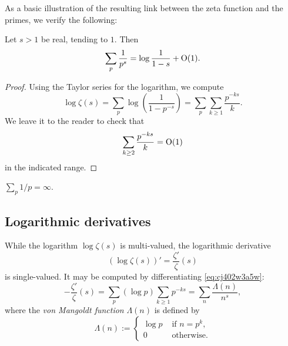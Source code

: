 \documentclass[reqno]{amsart}  \numberwithin{theorem}{section} \numberwithin{equation}{section}
\begin{document}
As a basic illustration of the resulting link between the zeta function and the primes, we verify the following:
\begin{lemma}\label{lemma:cj56e5ihnv}
  Let $s > 1$ be real, tending to $1$.  Then
  \begin{equation*}
    \sum_p \frac{1}{ p^s } = \log \frac{1}{1 - s} + \operatorname{O}(1).
  \end{equation*}
\end{lemma}
\begin{proof}
  Using the Taylor series for the logarithm, we compute
  \begin{equation}\label{eq:cj402w3a5w}
    \log \zeta (s) = \sum_p \log \left( \frac{1}{1 - p^{- s}} \right)
    =
    \sum_p \sum_{k \geq 1} \frac{p^{- k s }}{ k}.
  \end{equation}
  We leave it to the reader to check that
  \begin{equation}
    \sum_{k \geq 2} \frac{p^{- k s}}{ k }  = \operatorname{O}(1)
  \end{equation}
  in the indicated range.
\end{proof}
\begin{corollary}\label{corollary:cj56e5ijg7}
  $\sum_p 1 / p = \infty$.
\end{corollary}

\subsection{Logarithmic derivatives}
While the logarithm $\log \zeta(s)$ is multi-valued, the logarithmic derivative
\begin{equation*}
  \left( \log \zeta(s) \right) '
  = \frac{\zeta '}{\zeta } (s) 
\end{equation*}
is single-valued.  It may be computed by differentiating \eqref{eq:cj402w3a5w}:
\begin{equation*}
  - \frac{\zeta '}{ \zeta } (s) = \sum _p (\log p) \sum_{k \geq 1} p^{- k s} = \sum_n \frac{\Lambda(n) }{n^s},
\end{equation*}
where the \emph{von Mangoldt function} $\Lambda(n)$ is defined by
\begin{equation*}
  \Lambda(n) :=
  \begin{cases}
    \log p & \text{ if } n = p ^k, \\
    0 & \text{ otherwise.}
  \end{cases}
\end{equation*}
\end{document}
